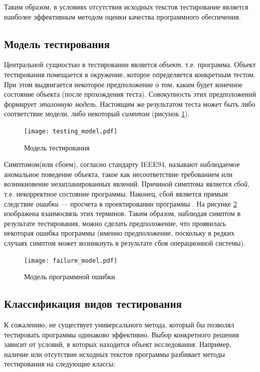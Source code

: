 \documentclass[a4paper,14pt,href]{article}
\begin{document}
   Таким образом, в условиях отсутствия исходных текстов тестирование является наиболее эффективным методом оценки качества программного обеспечения. 
\newpage
\subsection{Модель тестирования}
\label{TestingModel}
  Центральной сущностью в тестировании является \textit{объект}, т.е. программа. Объект тестирования помещается в окружение, которое определяется конкретным тестом. При этом выдвигается некоторое предположение о том, каким будет конечное состояние объекта (после прохождения теста). Совокупность этих предположений формирует \textit{эталонную модель}. Настоящим же результатом теста может быть либо соответствие модели, либо некоторый \textit{симптом} (рисунок \ref{fig:TestingModel}).

\begin{figure}[htbp]
\begin{center}
	\texttt{[image: testing\_model.pdf]}
    \caption{Модель тестирования}
    \label{fig:TestingModel}
\end{center}
\end{figure}

	Симптомом(или сбоем), согласно стандарту IEEE94, называют наблюдаемое аномальное поведение объекта, такое как несоответствие требованием или возникновение незапланированных явлений. Причиной симптома является \textit{сбой}, т.е. некорректное состояние программы. Наконец, сбой является прямым следствие \textit{ошибки} --- просчета в проектировании программы\cite{Ahin} \cite{TestingBlackBox}. На рисунке \ref{fig:FailureModel} изображена взаимосвязь этих терминов. Таким образом, наблюдая симптом в результате тестирования, можно сделать предположение, что проявилась некоторая ошибка программы (именно предположение, поскольку в редких случаях симптом может возникнуть в результате сбоя операционной системы).

\begin{figure}[htbp]
\begin{center}
	\texttt{[image: failure\_model.pdf]}
    \caption{Модель программной ошибки}
    \label{fig:FailureModel}
\end{center}
\end{figure}

\subsection{Классификация видов тестирования}
	К сожалению, не существует универсального метода, который бы позволял тестировать программы одинаково эффективно. Выбор конкретного решения зависит от условий, в которых находится объект исследования. Например, наличие или отсутствие исходных текстов программы разбивает методы тестирования на следующие классы:
\end{document}
